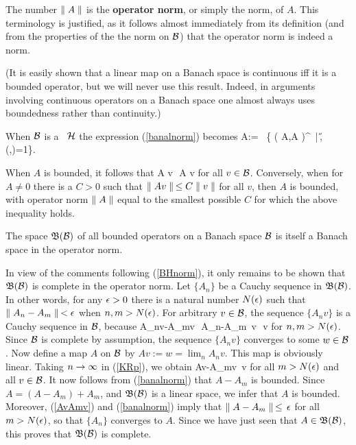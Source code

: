 The number $\parallel A\parallel$ is the {\bf operator norm}, or simply the norm, of
$A$.  This terminology is justified, as it follows almost immediately
from its definition (and from the properties of the the norm on ${\cal B}$)
that the operator norm is indeed a norm.

(It is easily shown that a linear map on a Banach space is continuous
iff it is a bounded operator, but we will never use this
result. Indeed, in arguments involving continuous operators on a
Banach space one almost always uses boundedness rather than
continuity.)

When $\cal B$ is a \Hs\ ${\cal H}$ the expression (\ref{banalnorm}) becomes
\be \n A\n:= \sup\, \{ ( A\Ps,A \Ps)^{\half}\, |\,\Ps\in\H,\,
(\Ps,\Ps)=1\}.   \ee

When $A$ is bounded, it follows that \be \n A v\n\,\leq\, \n A\n\; \n
v\n {} \ee for all $v\in{\cal B}$.  Conversely, when for $A\neq 0$
there is a $C>0$ such that $\parallel A v\parallel\,\leq C \parallel v\parallel$ for all $v$, then
$A$ is bounded, with operator norm $\parallel A\parallel$ equal to the smallest
possible $C$ for which the above inequality holds.
\begin{Proposition}
The space ${\frak B}({\cal B})$ of all bounded operators on a Banach space ${\cal B}$
is itself a Banach space in the operator norm. \end{Proposition}

In view of the comments following (\ref{BHnorm}), it only remains to
be shown that ${\frak B}({\cal B})$ is complete in the operator norm.  Let
$\{A_n\}$ be a Cauchy sequence in ${\frak B}({\cal B})$. In other words, for any
$\epsilon>0$ there is a natural number $N(\epsilon)$ such that $\parallel
A_n-A_m\parallel\,<\epsilon$ when $n,m>N(\epsilon)$. For arbitrary $v\in{\cal B}$, the
sequence $\{A_n v\}$ is a Cauchy sequence in ${\cal B}$, because \be \n
A_nv-A_mv\n\,\leq\, \n A_n-A_m\n\, \n v\n\,\leq\, \ep \n v\n {}
\ee for $n,m>N(\epsilon)$. Since ${\cal B}$ is complete by assumption, the
sequence $\{A_n v\}$ converges to some $w\in{\cal B}$. Now define a map $A$
on ${\cal B}$ by $Av:=w=\lim_n A_n v$. This map is obviously linear.
Taking $n\rightarrow\infty$ in (\ref{KRp}), we obtain \be \n Av-A_mv\n\,\leq
\ep \n v\n {} \ee for all $m>N(\epsilon)$ and all $v\in{\cal B}$. It now
follows from (\ref{banalnorm}) that $A-A_m$ is bounded. Since
$A=(A-A_m)+A_m$, and ${\frak B}({\cal B})$ is a linear space, we infer that $A$ is
bounded. Moreover, (\ref{AvAmv}) and (\ref{banalnorm}) imply that $\parallel
A-A_m\parallel\,\leq\, \epsilon$ for all $m>N(\epsilon)$, so that $\{A_n\}$ converges
to $A$. Since we have just seen that $A\in{\frak B}({\cal B})$, this proves that
${\frak B}({\cal B})$ is complete. \enp

